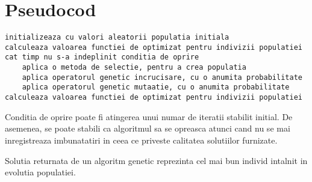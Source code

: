 \section{Pseudocod}

\begin{verbatim}
initializeaza cu valori aleatorii populatia initiala
calculeaza valoarea functiei de optimizat pentru indivizii populatiei 
cat timp nu s-a indeplinit conditia de oprire
    aplica o metoda de selectie, pentru a crea populatia
    aplica operatorul genetic incrucisare, cu o anumita probabilitate
    aplica operatorul genetic mutaatie, cu o anumita probabilitate
calculeaza valoarea functiei de optimizat pentru indivizii populatiei
\end{verbatim}

Conditia de oprire poate fi atingerea unui numar de iteratii stabilit initial. De asemenea, se poate stabili ca algoritmul sa se opreasca atunci cand nu se mai inregistreaza imbunatatiri in ceea ce priveste calitatea solutiilor furnizate. 

Solutia returnata de un algoritm genetic reprezinta cel mai bun individ intalnit in evolutia populatiei. 

\hfill \break
\hfill \break

\clearpage